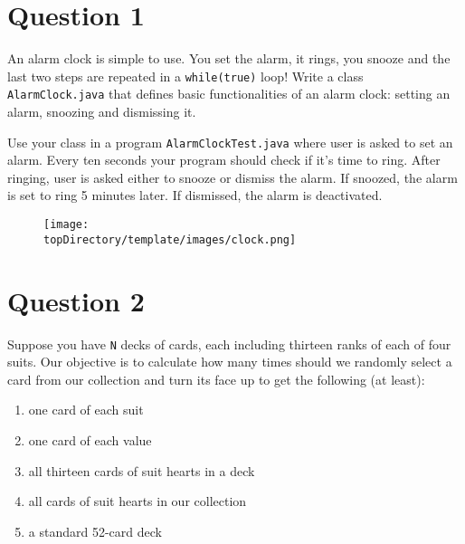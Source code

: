 %
%
%
%

\section*{Question 1}
An alarm clock is simple to use.
You set the alarm, it rings, you snooze and the last two steps are repeated in a \texttt{while(true)} loop! Write a class \texttt{AlarmClock.java} that defines basic functionalities of an alarm clock: setting an alarm, snoozing and dismissing it.

Use your class in a program \texttt{AlarmClockTest.java} where user is asked to set an alarm.
Every ten seconds your program should check if it's time to ring.
After ringing, user is asked either to snooze or dismiss the alarm.
If snoozed, the alarm is set to ring 5 minutes later.
If dismissed, the alarm is deactivated.

\begin{figure}[H]\centering
\texttt{[image: \\topDirectory/template/images/clock.png]}
\end{figure}
\newpage
\section*{Question 2}
Suppose you have \texttt{N} decks of cards, each including thirteen ranks of each of four suits. Our objective is to calculate how many times should we randomly select a card from our collection and turn its face up to get the following (at least):
\begin{enumerate}[itemsep=0mm,label=(\alph*)]
\item one card of each suit
\item one card of each value
\item all thirteen cards of suit hearts in a deck
\item all cards of suit hearts in our collection
\item a standard 52-card deck
\end{enumerate}

